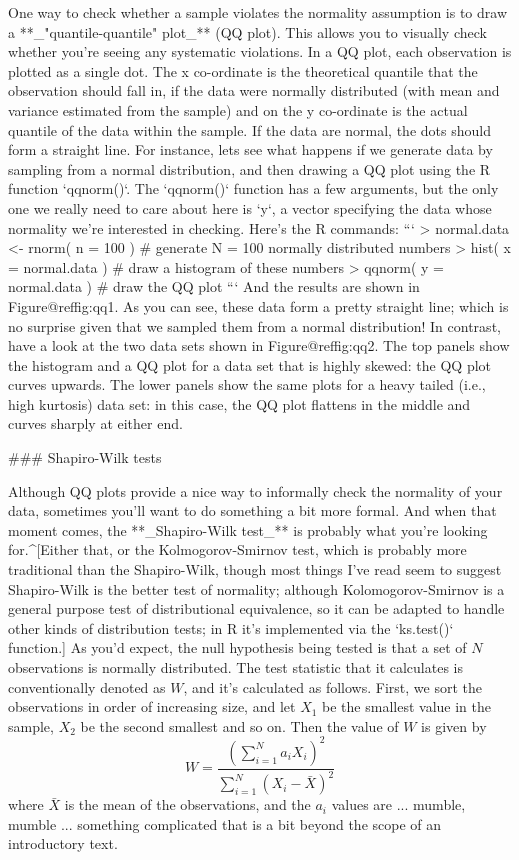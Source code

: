 One way to check whether a sample violates the normality assumption is to draw a **_"quantile-quantile" plot_** (QQ plot). This allows you to visually check whether you're seeing any systematic violations. In a QQ plot, each observation is plotted as a single dot. The x co-ordinate is the theoretical quantile that the observation should fall in, if the data were normally distributed (with mean and variance estimated from the sample) and on the y co-ordinate is the actual quantile of the data within the sample. If the data are normal, the dots should form a straight line. For instance, lets see what happens if we generate data by sampling from a normal distribution, and then drawing a QQ plot using the R function `qqnorm()`. The `qqnorm()` function has a few arguments, but the only one we really need to care about here is `y`, a vector specifying the data whose normality we're interested in checking. Here's the R commands:
```
> normal.data <- rnorm( n = 100 )  # generate N = 100 normally distributed numbers
> hist( x = normal.data )          # draw a histogram of these numbers
> qqnorm( y = normal.data )        # draw the QQ plot
```
And the results are shown in Figure@reffig:qq1. As you can see, these data form a pretty straight line; which is no surprise given that we sampled them from a normal distribution! In contrast, have a look at the two data sets shown in Figure@reffig:qq2. The top panels show the histogram and a QQ plot for a data set that is highly skewed: the QQ plot curves upwards. The lower panels show the same plots for a heavy tailed (i.e., high kurtosis) data set: in this case, the QQ plot flattens in the middle and curves sharply at either end.




### Shapiro-Wilk tests

Although QQ plots provide a nice way to informally check the normality of your data, sometimes you'll want to do something a bit more formal. And when that moment comes, the **_Shapiro-Wilk test_** \cite{Shapiro1965} is probably what you're looking for.^[Either that, or the Kolmogorov-Smirnov test, which is probably more traditional than the Shapiro-Wilk, though most things I've read seem to suggest Shapiro-Wilk is the better test of normality; although Kolomogorov-Smirnov is a general purpose test of distributional equivalence, so it can be adapted to handle other kinds of distribution tests; in R it's implemented via the `ks.test()` function.] As you'd expect, the null hypothesis being tested is that a set of $N$ observations is normally distributed. The test statistic that it calculates is conventionally denoted as $W$, and it's calculated as follows. First, we sort the observations in order of increasing size, and let $X_1$ be the smallest value in the sample, $X_2$ be the second smallest and so on. Then the value of $W$ is given by
$$
W = \frac{ \left( \sum_{i = 1}^N a_i X_i \right)^2 }{ \sum_{i = 1}^N (X_i - \bar{X})^2}
$$
where $\bar{X}$ is the mean of the observations, and the $a_i$ values are ... mumble, mumble ... something complicated that is a bit beyond the scope of an introductory text. 

